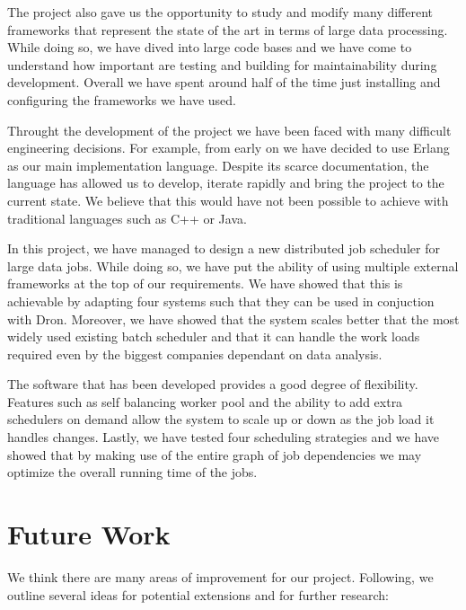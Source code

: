 \documentclass[11pt,a4paper,twoside]{report}
\begin{document}
The project also gave us the opportunity to study and modify many different frameworks that represent the state of the art in terms of large data processing. While doing so, we have dived into large code bases and we have come to understand how important are testing and building for maintainability during development. Overall we have spent around half of the time just installing and configuring the frameworks we have used.


Throught the development of the project we have been faced with many difficult engineering decisions. For example, from early on we have decided to use Erlang as our main implementation language. Despite its scarce documentation, the language has allowed us to develop, iterate rapidly and bring the project to the current state. We believe that this would have not been possible to achieve with traditional languages such as C++ or Java.


In this project, we have managed to design a new distributed job scheduler for large data jobs. While doing so, we have put the ability of using multiple external frameworks at the top of our requirements. We have showed that this is achievable by adapting four systems such that they can be used in conjuction with Dron. Moreover, we have showed that the system scales better that the most widely used existing batch scheduler and that it can handle the work loads required even by the biggest companies dependant on data analysis.


The software that has been developed provides a good degree of flexibility. Features such as self balancing worker pool and the ability to add extra schedulers on demand allow the system to scale up or down as the job load it handles changes. Lastly, we have tested four scheduling strategies and we have showed that by making use of the entire graph of job dependencies we may optimize the overall running time of the jobs.


\section{Future Work}
We think there are many areas of improvement for our project. Following, we outline several ideas for potential extensions and for further research:
\end{document}
